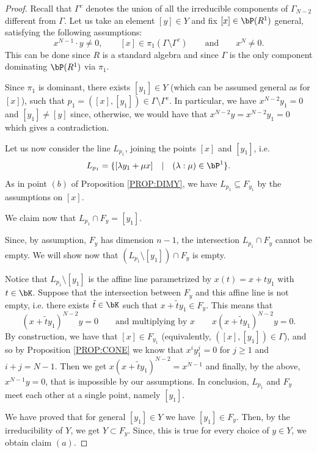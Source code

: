 \documentclass[a4paper,11pt]{amsart}
\begin{document}
\begin{proof}
Recall that $\Gamma^c$ denotes the union of all the irreducible components of $\Gamma_{N-2}$ different from $\Gamma$.
Let us take an element $[y]\in Y$ and fix $[x]\in\bP(R^1)$ general, satisfying the following assumptions:
$$x^{N-1}\cdot y\ne 0,\qquad  [x]\in \pi_1(\Gamma\setminus \Gamma^c) \qquad \mbox{and} \qquad x^N\ne0.$$
This can be done since $R$ is a standard algebra and since $\Gamma$ is the only component dominating $\bP(R^1)$ via $\pi_1$.
\vspace{2mm}

Since $\pi_1$ is dominant, there exists $[y_1]\in Y$ (which can be assumed general as for $[x]$), such that $p_1=([x],[y_1])\in \Gamma\setminus \Gamma^c$. In particular, we have $x^{N-2}y_1=0$ and $[y_1]\ne[y]$ since, otherwise, we would have that $x^{N-2}y=x^{N-2}y_1=0$ which gives a contradiction.
\vspace{2mm}

Let us now consider the line $L_{p_1}$, joining the points $[x]$ and $[y_1]$, i.e. 
$$L_{p_1}=\{[\lambda y_1+\mu x]\quad|\quad (\lambda:\mu)\in \bP^1\}.$$ 
As in point $(b)$ of Proposition \ref{PROP:DIMY}, we have $L_{p_1}\subseteq F_{y_1}$ by the assumptions on $[x]$.

We claim now that $L_{p_1}\cap F_{y}={[y_1]}$.
\vspace{2mm}

Since, by assumption, $F_y$ has dimension $n-1$, the intersection $L_{p_1}\cap F_{y}$ cannot be empty. We will show now that $(L_{p_1}\setminus [y_1])\cap F_y$ is empty.
\vspace{2mm}

Notice that $L_{p_1}\setminus [y_1]$ is the affine line parametrized by $x(t)=x+ty_1$ with $t\in\bK$. Suppose that the intersection between $F_y$ and this affine line is not empty, i.e. there exists $\tilde{t}\in\bK$ such that $x+\tilde{t}y_1\in F_y$. This means that
$$(x+\tilde{t}y_1)^{N-2}y=0 \qquad \mbox{and multiplying by }x \qquad x(x+\tilde{t}y_1)^{N-2}y=0.$$
By construction, we have that $[x]\in F_{y_1}$ (equivalently, $([x],[y_1])\in\Gamma$), and so by Proposition \ref{PROP:CONE} we know that $x^iy_1^j=0$ for $j\ge1$ and $i+j=N-1$. Then we get $x(x+\tilde{t}y_1)^{N-2}=x^{N-1}$ and finally, by the above, $x^{N-1}y=0$, that is impossible by our assumptions. In conclusion, $L_{p_1}$ and $F_y$ meet each other at a single point, namely $[y_1]$.
\vspace{2mm}

We have proved that for general $[y_1]\in Y$ we have $[y_1]\in F_y$. Then, by the irreducibility of $Y$, we get $Y\subset F_y$. Since, this is true for every choice of $y\in Y$, we obtain claim $(a)$.
\vspace{2mm}


\end{proof}
\end{document}
